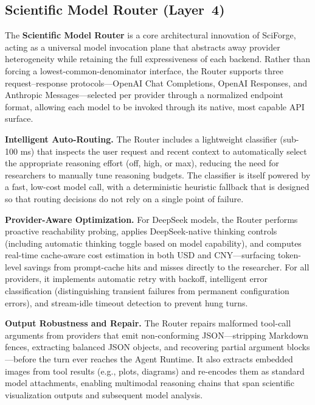 \documentclass[sn-basic,Numbered,pdflatex]{sn-jnl}
\begin{document}
\subsection{Scientific Model Router (Layer~4)}
The \textbf{Scientific Model Router} is a core architectural innovation of SciForge, acting as a universal model invocation plane that abstracts away provider heterogeneity while retaining the full expressiveness of each backend. Rather than forcing a lowest-common-denominator interface, the Router supports three request--response protocols---OpenAI Chat Completions, OpenAI Responses, and Anthropic Messages---selected per provider through a normalized endpoint format, allowing each model to be invoked through its native, most capable API surface.

\textbf{Intelligent Auto-Routing.} The Router includes a lightweight classifier (sub-100 ms) that inspects the user request and recent context to automatically select the appropriate reasoning effort (off, high, or max), reducing the need for researchers to manually tune reasoning budgets. The classifier is itself powered by a fast, low-cost model call, with a deterministic heuristic fallback that is designed so that routing decisions do not rely on a single point of failure.

\textbf{Provider-Aware Optimization.} For DeepSeek models, the Router performs proactive reachability probing, applies DeepSeek-native thinking controls (including automatic thinking toggle based on model capability), and computes real-time cache-aware cost estimation in both USD and CNY---surfacing token-level savings from prompt-cache hits and misses directly to the researcher. For all providers, it implements automatic retry with backoff, intelligent error classification (distinguishing transient failures from permanent configuration errors), and stream-idle timeout detection to prevent hung turns.

\textbf{Output Robustness and Repair.} The Router repairs malformed tool-call arguments from providers that emit non-conforming JSON---stripping Markdown fences, extracting balanced JSON objects, and recovering partial argument blocks---before the turn ever reaches the Agent Runtime. It also extracts embedded images from tool results (e.g., plots, diagrams) and re-encodes them as standard model attachments, enabling multimodal reasoning chains that span scientific visualization outputs and subsequent model analysis.
\end{document}
